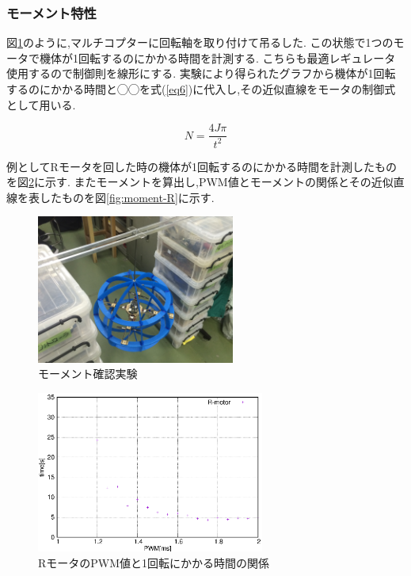 \documentclass[12pt,oneside]{sotsuken_paper}
\begin{document}
\subsubsection{モーメント特性}
図\ref{fig:moment-test}のように,マルチコプターに回転軸を取り付けて吊るした.
この状態で1つのモータで機体が1回転するのにかかる時間を計測する.
こちらも最適レギュレータ使用するので制御則を線形にする.
実験により得られたグラフから機体が1回転するのにかかる時間と◯◯を式(\ref{eq6})に代入し,その近似直線をモータの制御式として用いる.

\begin{equation}
	N = \frac{4J\pi}{t^2}
	\label{eq6}
\end{equation}
 


例としてRモータを回した時の機体が1回転するのにかかる時間を計測したものを図\ref{fig:moment-time-R}に示す.
またモーメントを算出し,PWM値とモーメントの関係とその近似直線を表したものを図\ref{fig:moment-R}に示す.

\begin{figure}[htbp]
	\begin{center}
		\includegraphics[width=65mm]{image/moment/moment-test.jpg}
		\caption{モーメント確認実験}
		\label{fig:moment-test}
	\end{center}
\end{figure}

\begin{figure}[htbp]
	\begin{center}
		\includegraphics[width=75mm]{image/moment/moment-time-R.eps}
		\caption{RモータのPWM値と1回転にかかる時間の関係}
		\label{fig:moment-time-R}
	\end{center}
\end{figure}
\end{document}
